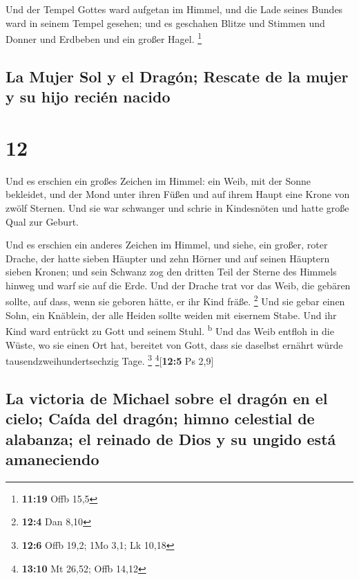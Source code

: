  Und der Tempel Gottes ward aufgetan im Himmel, und die
Lade seines Bundes ward in seinem Tempel gesehen; und es geschahen
Blitze und Stimmen und Donner und Erdbeben und ein großer Hagel.
\footnote{\textbf{11:19} Offb 15,5}

\hypertarget{la-mujer-sol-y-el-draguxf3n-rescate-de-la-mujer-y-su-hijo-reciuxe9n-nacido}{%
\subsection{La Mujer Sol y el Dragón; Rescate de la mujer y su hijo
recién
nacido}\label{la-mujer-sol-y-el-draguxf3n-rescate-de-la-mujer-y-su-hijo-reciuxe9n-nacido}}

\hypertarget{section-11}{%
\section{12}\label{section-11}}

 Und es erschien ein großes Zeichen im Himmel: ein Weib,
mit der Sonne bekleidet, und der Mond unter ihren Füßen und auf ihrem
Haupt eine Krone von zwölf Sternen.  Und sie war schwanger
und schrie in Kindesnöten und hatte große Qual zur Geburt.

 Und es erschien ein anderes Zeichen im Himmel, und siehe,
ein großer, roter Drache, der hatte sieben Häupter und zehn Hörner und
auf seinen Häuptern sieben Kronen;  und sein Schwanz zog
den dritten Teil der Sterne des Himmels hinweg und warf sie auf die
Erde. Und der Drache trat vor das Weib, die gebären sollte, auf dass,
wenn sie geboren hätte, er ihr Kind fräße. \footnote{\textbf{12:4} Dan
  8,10}  Und sie gebar einen Sohn, ein Knäblein, der alle
Heiden sollte weiden mit eisernem Stabe. Und ihr Kind ward entrückt zu
Gott und seinem Stuhl. \textsuperscript{b}  Und das Weib
entfloh in die Wüste, wo sie einen Ort hat, bereitet von Gott, dass sie
daselbst ernährt würde tausendzweihundertsechzig Tage. \footnote{\textbf{12:6}
  Offb 19,2; 1Mo 3,1; Lk 10,18} \footnote{\textbf{13:10} Mt 26,52; Offb
  14,12}{[}\textbf{12:5} Ps 2,9{]}

\hypertarget{la-victoria-de-michael-sobre-el-draguxf3n-en-el-cielo-cauxedda-del-draguxf3n-himno-celestial-de-alabanza-el-reinado-de-dios-y-su-ungido-estuxe1-amaneciendo}{%
\subsection{La victoria de Michael sobre el dragón en el cielo; Caída
del dragón; himno celestial de alabanza; el reinado de Dios y su ungido
está
amaneciendo}\label{la-victoria-de-michael-sobre-el-draguxf3n-en-el-cielo-cauxedda-del-draguxf3n-himno-celestial-de-alabanza-el-reinado-de-dios-y-su-ungido-estuxe1-amaneciendo}}

